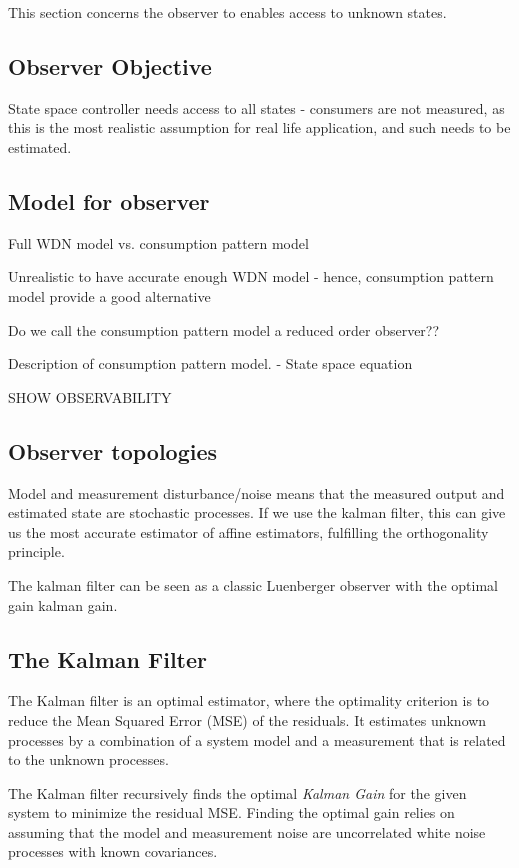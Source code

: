This section concerns the observer to enables access to unknown states.

\subsection{Observer Objective}

State space controller needs access to all states - consumers are not measured, as this is the most realistic assumption for real life application, and such needs to be estimated.




\subsection{Model for observer}
Full WDN model vs. consumption pattern model

Unrealistic to have accurate enough WDN model - hence, consumption pattern model provide a good alternative

Do we call the consumption pattern model a reduced order observer??

Description of consumption pattern model. 
 - State space equation
 
SHOW OBSERVABILITY

\subsection{Observer topologies}
Model and measurement disturbance/noise means that the measured output and estimated state are stochastic processes. If we use the kalman filter, this can give us the most accurate estimator of affine estimators, fulfilling the orthogonality principle. 

The kalman filter can be seen as a classic Luenberger observer with the optimal gain kalman gain.


\clearpage \newpage
\subsection{The Kalman Filter}
The Kalman filter is an optimal estimator, where the optimality criterion is to reduce the Mean Squared Error (MSE) of the residuals.
It estimates unknown processes by a combination of a system model and a measurement that is related to the unknown processes. 

The Kalman filter recursively finds the optimal \textit{Kalman Gain} for the given system to minimize the residual MSE. Finding the optimal gain relies on assuming that the model and measurement noise are uncorrelated white noise processes with known covariances. 

